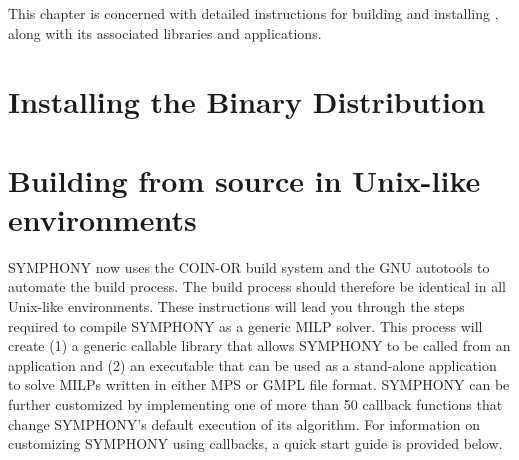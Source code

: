 
This chapter is concerned with detailed instructions for building and
installing \BB, along with its associated libraries and applications.

\section{Installing the Binary Distribution}


\section{Building from source in Unix-like environments}
\label{getting_started_unix}

SYMPHONY now uses the COIN-OR build system and the GNU autotools to automate
the build process. The build process should therefore be identical in all
Unix-like environments. These instructions will lead you through the steps
required to compile SYMPHONY as a generic MILP solver. This process will
create (1) a generic callable library that allows SYMPHONY to be called from
an application and (2) an executable that can be used as a stand-alone
application to solve MILPs written in either MPS or GMPL file format. SYMPHONY
can be further customized by implementing one of more than 50 callback
functions that change SYMPHONY's default execution of its algorithm. For
information on customizing SYMPHONY using callbacks, a quick start guide is
provided below.

